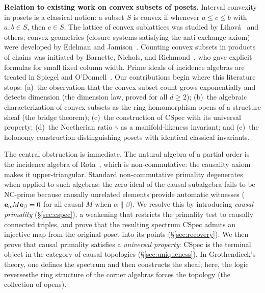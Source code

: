 \documentclass[11pt,a4paper]{article}
\theoremstyle{plain}
\theoremstyle{definition}
\theoremstyle{remark}
\newcommand{\CSpec}{\mathrm{CSpec}}
\begin{document}
\textbf{Relation to existing work on convex subsets of posets.}
Interval convexity in posets is a classical notion: a subset $S$
is convex if whenever $a \leq c \leq b$ with $a, b \in S$, then
$c \in S$. The lattice of convex sublattices was studied by
Lihov\'a~\cite{lihova1999} and others; convex geometries
(closure systems satisfying the anti-exchange axiom) were
developed by Edelman and Jamison~\cite{edelmanjamison1985}.
Counting convex subsets in products of chains was initiated by
Barnette, Nichols, and Richmond~\cite{barnette2019}, who gave
explicit formulas for small fixed column width.
Prime ideals of incidence algebras are treated in
Spiegel and O'Donnell~\cite{spiegel1997}.
Our contributions begin where this literature stops:
(a)~the observation that the convex subset count
grows exponentially and detects dimension (the dimension law,
proved for all $d \geq 2$);
(b)~the algebraic characterization of convex subsets as the
ring homomorphism opens of a structure sheaf (the bridge theorem);
(c)~the construction of $\CSpec$ with its universal property;
(d)~the Noetherian ratio $\gamma$ as a manifold-likeness
invariant;
and (e)~the holonomy construction distinguishing posets with
identical classical invariants.

The central obstruction is immediate.
The natural algebra of a partial order is the incidence algebra of Rota~\cite{rota1964}, which is non-commutative: the causality axiom makes it upper-triangular.
Standard non-commutative primality degenerates when applied to such algebras: the zero ideal of the causal subalgebra fails to be NC-prime because causally unrelated elements provide automatic witnesses (${\bf e}_\alpha M {\bf e}_\beta = 0$ for all causal $M$ when $\alpha \| \beta$).
We resolve this by introducing \emph{causal primality} (\S\ref{sec:cspec}), a weakening that restricts the primality test to causally connected triples, and prove that the resulting spectrum $\CSpec$ admits an injective map from the original poset into its points (\S\ref{sec:recovery}).
We then prove that causal primality satisfies a \emph{universal property}: $\CSpec$ is the terminal object in the category of causal topologies (\S\ref{sec:uniqueness}).
In Grothendieck's theory, one defines the spectrum and then constructs the sheaf; here, the logic reverses\textemdash the ring structure of the corner algebras forces the topology (the collection of opens).
\end{document}
